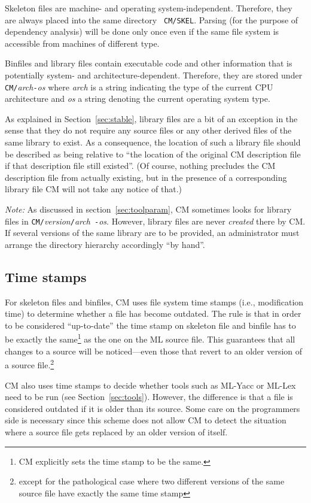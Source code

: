 \documentclass[titlepage,letterpaper]{article}
\begin{document}
Skeleton files are machine- and operating system-independent.
Therefore, they are always placed into the same directory {\tt
CM/SKEL}. Parsing (for the purpose of dependency analysis) will be
done only once even if the same file system is accessible from
machines of different type.

Binfiles and library files contain executable code and other
information that is potentially system- and architecture-dependent.
Therefore, they are stored under {\tt CM/}{\it arch}{\tt -}{\it os}
where {\it arch} is a string indicating the type of the current
CPU architecture and {\it os} a string denoting the current operating
system type.

As explained in Section~\ref{sec:stable}, library files are a bit of
an exception in the sense that they do not require any source files or
any other derived files of the same library to exist.  As a
consequence, the location of such a library file should be described
as being relative to ``the location of the original CM description
file if that description file still existed''.  (Of course, nothing
precludes the CM description file from actually existing, but in the
presence of a corresponding library file CM will not take any notice
of that.)

{\em Note:} As discussed in section~\ref{sec:toolparam}, CM sometimes
looks for library files in {\tt CM/}{\it version}{\tt /}{\it arch}{\tt
-}{\it os}.  However, library files are never {\em created} there by
CM.  If several versions of the same library are to be provided, an
administrator must arrange the directory hierarchy accordingly ``by
hand''.

\subsection{Time stamps}

For skeleton files and binfiles, CM uses file system time stamps
(i.e., modification time) to determine whether a file has become
outdated.  The rule is that in order to be considered ``up-to-date''
the time stamp on skeleton file and binfile has to be exactly the
same\footnote{CM explicitly sets the time stamp to be the same.} as
the one on the ML source file.  This guarantees that all changes to a
source will be noticed---even those that revert to an older version of
a source file.\footnote{except for the pathological case where two
different versions of the same source file have exactly the same time
stamp}

CM also uses time stamps to decide whether tools such as ML-Yacc or
ML-Lex need to be run (see Section~\ref{sec:tools}).  However, the
difference is that a file is considered outdated if it is older than
its source.  Some care on the programmers side is necessary since this
scheme does not allow CM to detect the situation where a source file
gets replaced by an older version of itself.
\end{document}
